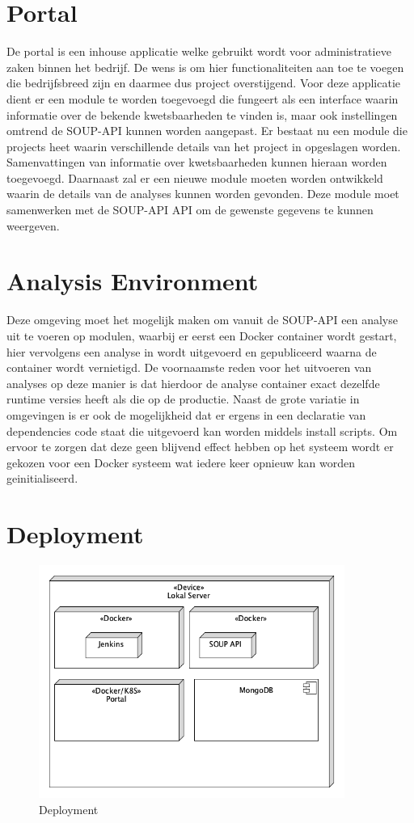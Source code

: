\section{Portal}\label{sec:arch-portal} De portal is een inhouse applicatie welke gebruikt wordt voor administratieve zaken binnen het bedrijf. De wens is om hier functionaliteiten aan toe te voegen die bedrijfsbreed zijn en daarmee dus project overstijgend. Voor deze applicatie dient er een module te worden toegevoegd die fungeert als een interface waarin informatie over de bekende kwetsbaarheden te vinden is, maar ook instellingen omtrend de SOUP-API kunnen worden aangepast. Er bestaat nu een module die projects heet waarin verschillende details van het project in opgeslagen worden. Samenvattingen van informatie over kwetsbaarheden kunnen hieraan worden toegevoegd.
Daarnaast zal er een nieuwe module moeten worden ontwikkeld waarin de details van de analyses kunnen worden gevonden. Deze module moet samenwerken met de SOUP-API API om de gewenste gegevens te kunnen weergeven.


\section{Analysis Environment}\label{sec:analysis-environment}
Deze omgeving moet het mogelijk maken om vanuit de SOUP-API een analyse uit te voeren op modulen, waarbij er eerst een Docker container wordt gestart, hier vervolgens een analyse in wordt uitgevoerd en gepubliceerd waarna de container wordt vernietigd. De voornaamste reden voor het uitvoeren van analyses op deze manier is dat hierdoor de analyse container exact dezelfde runtime versies heeft als die op de productie. Naast de grote variatie in omgevingen is er ook de mogelijkheid dat er ergens in een declaratie van dependencies code staat die uitgevoerd kan worden middels install scripts. Om ervoor te zorgen dat deze geen blijvend effect hebben op het systeem wordt er gekozen voor een Docker systeem wat iedere keer opnieuw kan worden geinitialiseerd.


\section{Deployment}\label{sec:deployment}


\begin{figure}[bth]
    \myfloatalign
    \includegraphics[width=10cm]{gfx/umlet/exports/deployment}
    \caption{Deployment }
    \label{fig:deployment}
\end{figure}

